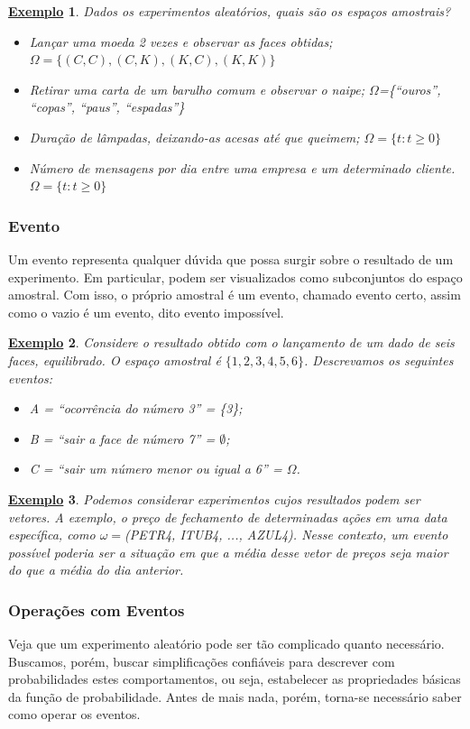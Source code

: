 \documentclass{article}
\newtheorem{example}{\underline{Exemplo}}
\begin{document}
\begin{example}
  Dados os experimentos aleatórios, quais são os espaços amostrais?
 \begin{itemize}
   \item[\(E_{1}\))] Lançar uma moeda 2 vezes e observar as faces obtidas; \(\Omega =\{(C, C), (C, K), (K, C), (K, K)\}\)
   \item[\(E_{2}\))] Retirar uma carta de um barulho comum e observar o naipe; \(\Omega\)=\{``ouros'', ``copas'', ``paus'', ``espadas''\}
   \item[\(E_{3}\))] Duração de lâmpadas, deixando-as acesas até que queimem; \(\Omega = \{t: t\geq 0\}\)
   \item[\(E_{4}\))] Número de mensagens por dia entre uma empresa e um determinado cliente. \(\Omega = \{t: t\geq 0\}\)
 \end{itemize}
\end{example}
\subsubsection{Evento}
  Um evento representa qualquer dúvida que possa surgir sobre o resultado de um experimento. Em particular, podem ser visualizados como subconjuntos do espaço amostral. Com isso,
o próprio amostral é um evento, chamado evento certo, assim como o vazio é um evento, dito evento impossível.
\begin{example}
  Considere o resultado obtido com o lançamento de um dado de seis faces, equilibrado. O espaço amostral é \(\{1, 2, 3, 4, 5, 6\}\). Descrevamos os seguintes eventos:
 \begin{itemize}
   \item[1)] A = ``ocorrência do número 3'' = \{3\};
   \item[2)] B = ``sair a face de número 7'' = \(\emptyset\);
   \item[3)] C = ``sair um número menor ou igual a 6'' = \(\Omega \).
 \end{itemize}
\end{example}
\begin{example}
  Podemos considerar experimentos cujos resultados podem ser vetores. A exemplo, o preço de fechamento de determinadas
ações em uma data específica, como \(\omega = \)(PETR4, ITUB4, ..., AZUL4). Nesse contexto, um evento possível poderia ser 
a situação em que a média desse vetor de preços seja maior do que a média do dia anterior.
\end{example}
\subsubsection{Operações com Eventos}
  Veja que um experimento aleatório pode ser tão complicado quanto necessário. Buscamos, porém, buscar simplificações confiáveis para descrever com probabilidades
estes comportamentos, ou seja, estabelecer as propriedades básicas da função de probabilidade. Antes de mais nada, porém, torna-se necessário
saber como operar os eventos. 
\end{document}
